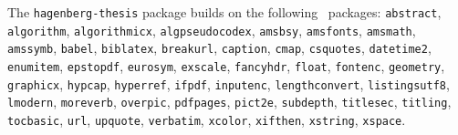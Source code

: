 \documentclass[english]{hgbarticle}
\begin{document}
\begin{sloppypar}
The \texttt{hagenberg-thesis} package builds on the following \latex\
packages:\newline
\texttt{abstract}, 
\texttt{algorithm}, 
\texttt{algorithmicx}, 
\texttt{algpseudocodex}, 
\texttt{amsbsy}, 
\texttt{amsfonts}, 
\texttt{amsmath}, 
\texttt{amssymb}, 
\texttt{babel}, 
\texttt{biblatex}, 
\texttt{breakurl}, 
\texttt{caption}, 
\texttt{cmap}, 
\texttt{csquotes}, 
\texttt{datetime2}, 
\texttt{enumitem}, 
\texttt{epstopdf}, 
\texttt{eurosym}, 
\texttt{exscale}, 
\texttt{fancyhdr}, 
\texttt{float}, 
\texttt{fontenc}, 
\texttt{geometry}, 
\texttt{graphicx}, 
\texttt{hypcap}, 
\texttt{hyperref}, 
\texttt{ifpdf}, 
\texttt{inputenc}, 
\texttt{lengthconvert},
\texttt{listingsutf8}, 
\texttt{lmodern}, 
\texttt{moreverb}, 
\texttt{overpic}, 
\texttt{pdfpages}, 
\texttt{pict2e}, 
\texttt{subdepth}, 
\texttt{titlesec}, 
\texttt{titling},
\texttt{tocbasic},
\texttt{url}, 
\texttt{upquote}, 
\texttt{verbatim}, 
\texttt{xcolor}, 
\texttt{xifthen},
\texttt{xstring},
\texttt{xspace}.
\end{sloppypar}
\end{document}
